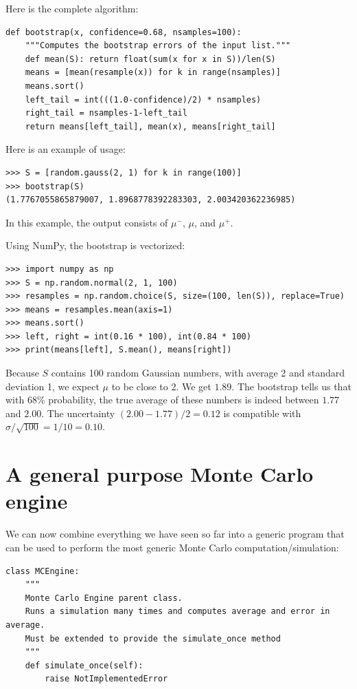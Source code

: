 \documentclass[justified, sixbynine]{tufte-book}
\def\ft{\small\tt}
\theoremstyle{plain}%
\newtheorem * {corollary}{Corollary}
\theoremstyle{definition}
\theoremstyle{remark}
\newtheorem * {remark}{Remark}
\newtheorem * {note}{Note}
\begin{document}
\begin{fullwidth}
Here is the complete algorithm:

\begin{lstlisting}[caption={in file: {\ft nlib.py}}]
def bootstrap(x, confidence=0.68, nsamples=100):
    """Computes the bootstrap errors of the input list."""
    def mean(S): return float(sum(x for x in S))/len(S)
    means = [mean(resample(x)) for k in range(nsamples)]
    means.sort()
    left_tail = int(((1.0-confidence)/2) * nsamples)
    right_tail = nsamples-1-left_tail
    return means[left_tail], mean(x), means[right_tail]
\end{lstlisting}

Here is an example of usage:

\begin{lstlisting}
>>> S = [random.gauss(2, 1) for k in range(100)]
>>> bootstrap(S)
(1.7767055865879007, 1.8968778392283303, 2.003420362236985)
\end{lstlisting}

In this example, the output consists of $\mu^-$, $\mu$, and $\mu^+$.

Using NumPy, the bootstrap is vectorized:

\begin{lstlisting}
>>> import numpy as np
>>> S = np.random.normal(2, 1, 100)
>>> resamples = np.random.choice(S, size=(100, len(S)), replace=True)
>>> means = resamples.mean(axis=1)
>>> means.sort()
>>> left, right = int(0.16 * 100), int(0.84 * 100)
>>> print(means[left], S.mean(), means[right])
\end{lstlisting}

Because $S$ contains 100 random Gaussian numbers, with average 2 and standard deviation 1, we expect $\mu$ to be close to 2. We get $1.89$. The bootstrap tells us that with 68\% probability, the true average of these numbers is indeed between $1.77$ and $2.00$. The uncertainty $(2.00-1.77)/2 = 0.12$ is compatible with $\sigma/\sqrt{100} = 1/10 = 0.10$.

\goodbreak\section{A general purpose Monte Carlo engine}

We can now combine everything we have seen so far into a generic program that can be used to perform the most generic Monte Carlo computation/simulation:


\begin{lstlisting}[caption={in file: {\ft nlib.py}}]
class MCEngine:
    """
    Monte Carlo Engine parent class.
    Runs a simulation many times and computes average and error in average.
    Must be extended to provide the simulate_once method
    """
    def simulate_once(self):
        raise NotImplementedError


\end{lstlisting}
\end{fullwidth}
\end{document}
